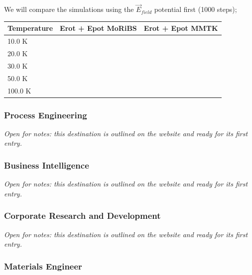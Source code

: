 \documentclass{article}
\begin{document}
We will compare the simulations using the \begin{math} \vec{E}_{field} \end{math} potential first (1000 steps);

\begin{center}
\begin{tabular*}{\textwidth}{ | p{} | p{}| p{}|}
\hline
\textbf{Temperature} & \textbf{Erot + Epot MoRiBS} & \textbf{Erot + Epot MMTK} \\ 
\hline 
10.0 K &  &  \\ 
\hline
20.0 K &  &  \\
\hline 
30.0 K &  &  \\ 
\hline 
50.0 K &  &  \\
\hline 
100.0 K &  &  \\
\hline 
\end{tabular*}
\end{center} 

\subsubsection{Process Engineering}\label{sec:process-engineering}
\textit{Open for notes: this destination is outlined on the website and ready for its first entry.}

\subsubsection{Business Intelligence}\label{sec:business-intelligence}
\textit{Open for notes: this destination is outlined on the website and ready for its first entry.}

\subsubsection{Corporate Research and Development}\label{sec:corporate-research-and-development}
\textit{Open for notes: this destination is outlined on the website and ready for its first entry.}

\subsubsection{Materials Engineer}\label{sec:materials-engineer}
\end{document}
